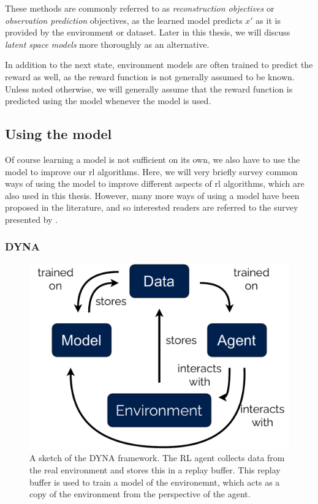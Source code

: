 These methods are commonly referred to as \emph{reconstruction objectives} or \emph{observation prediction} objectives, as the learned model predicts $x'$ as it is provided by the environment or dataset.
Later in this thesis, we will discuss \emph{latent space models} more thoroughly as an alternative.

In addition to the next state, environment models are often trained to predict the reward as well, as the reward function is not generally assumed to be known.
Unless noted otherwise, we will generally assume that the reward function is predicted using the model whenever the model is used.

\subsection{Using the model}

Of course learning a model is not sufficient on its own, we also have to use the model to improve our \ac{rl} algorithms.
Here, we will very briefly survey common ways of using the model to improve different aspects of \ac{rl} algorithms, which are also used in this thesis.
However, many more ways of using a model have been proposed in the literature, and so interested readers are referred to the survey presented by \textcite{moerland}. 

\subsubsection{DYNA}

\begin{figure}
    \centering
    \includegraphics[width=.6\textwidth]{figures/background/dyna.pdf}
    \caption{A sketch of the DYNA framework. The RL agent collects data from the real environment and stores this in a replay buffer. This replay buffer is used to train a model of the environemnt, which acts as a copy of the environment from the perspective of the agent.}
    \label{fig:background:dyna}
\end{figure}


